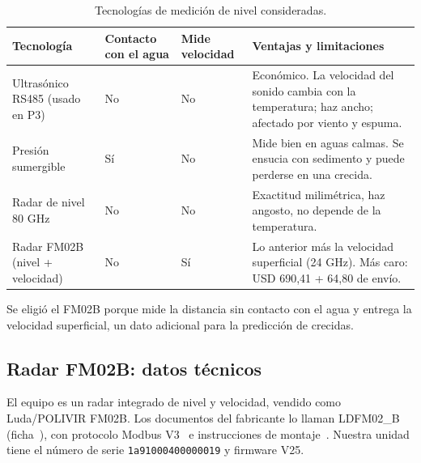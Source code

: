 \documentclass[11pt,a4paper]{article}
\begin{document}
\begin{table}[H]
    \centering
    \small
    \caption{Tecnologías de medición de nivel consideradas.}
    \begin{tabularx}{\textwidth}{>{\raggedright\arraybackslash}p{2.7cm}>{\centering\arraybackslash}p{1.4cm}>{\centering\arraybackslash}p{1.5cm}L}
        \toprule
        \textbf{Tecnología} & \textbf{Contacto con el agua} & \textbf{Mide velocidad} & \textbf{Ventajas y limitaciones} \\
        \midrule
        Ultrasónico RS485 (usado en P3) & No & No & Económico. La velocidad del
            sonido cambia con la temperatura; haz ancho; afectado por viento y
            espuma. \\
        Presión sumergible & Sí & No & Mide bien en aguas calmas. Se
            ensucia con sedimento y puede perderse en una crecida. \\
        Radar de nivel 80 GHz & No & No & Exactitud milimétrica, haz
            angosto, no depende de la temperatura. \\
        Radar FM02B (nivel + velocidad) & No & Sí & Lo anterior
            más la velocidad superficial (24 GHz). Más caro: USD
            690,41 + 64,80 de envío. \\
        \bottomrule
    \end{tabularx}
\end{table}

Se eligió el FM02B porque mide la distancia sin contacto con el agua y
entrega la velocidad superficial, un dato adicional para la predicción de
crecidas.

\subsection{Radar FM02B: datos técnicos}
\label{sec:radar}

El equipo es un radar integrado de nivel y velocidad, vendido como
Luda/POLIVIR FM02B. Los documentos del fabricante lo llaman LDFM02\_B
(ficha~\cite{fm02b_ficha}), con protocolo Modbus V3~\cite{fm02b_modbus} e
instrucciones de montaje~\cite{fm02b_montaje}. Nuestra unidad tiene el número
de serie \texttt{1a91000400000019} y firmware V25.
\end{document}
